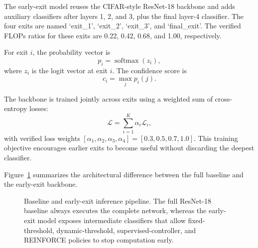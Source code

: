 \documentclass[10pt,twocolumn]{article}
\newcommand{\backbone}{ResNet-18}
\begin{document}
The early-exit model reuses the CIFAR-style \backbone{} backbone and adds auxiliary classifiers after layers 1, 2, and 3, plus the final layer-4 classifier. The four exits are named `exit\_1', `exit\_2', `exit\_3', and `final\_exit'. The verified FLOPs ratios for these exits are 0.22, 0.42, 0.68, and 1.00, respectively.

For exit $i$, the probability vector is
\begin{equation}
    p_i = \operatorname{softmax}(z_i),
\end{equation}
where $z_i$ is the logit vector at exit $i$. The confidence score is
\begin{equation}
    c_i = \max_j p_i(j).
\end{equation}

The backbone is trained jointly across exits using a weighted sum of cross-entropy losses:
\begin{equation}
    \mathcal{L} = \sum_{i=1}^{K} \alpha_i \mathcal{L}_i,
\end{equation}
with verified loss weights $[\alpha_1, \alpha_2, \alpha_3, \alpha_4] = [0.3, 0.5, 0.7, 1.0]$. This training objective encourages earlier exits to become useful without discarding the deepest classifier.

Figure~\ref{fig:method-pipeline} summarizes the architectural difference between the full baseline and the early-exit backbone.

\begin{figure}[!tbp]
    \centering
    \caption{Baseline and early-exit inference pipeline. The full \backbone{} baseline always executes the complete network, whereas the early-exit model exposes intermediate classifiers that allow fixed-threshold, dynamic-threshold, supervised-controller, and REINFORCE policies to stop computation early.}
    \label{fig:method-pipeline}
\end{figure}
\end{document}
